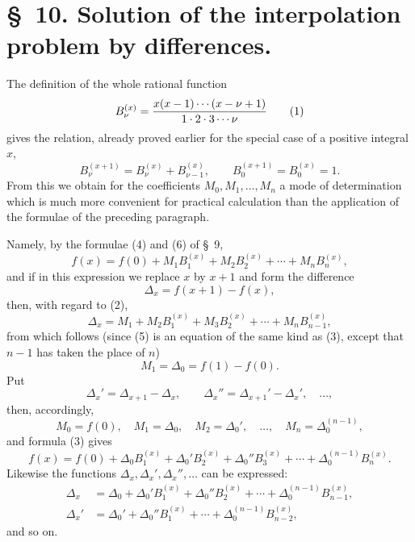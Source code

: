 \documentclass[11pt]{article}
\begin{document}
\section*{\S~10. Solution of the interpolation problem by differences.}

The definition of the whole rational function
\begin{equation}
 B_\nu^{(x)}={x(x-1)\cdots(x-\nu+1)\over 1\cdot2\cdot3\cdots\nu}
\tag{1}
\end{equation}
gives the relation, already proved earlier for the special case of a positive integral $x$,
\begin{equation}
 B_\nu^{(x+1)}=B_\nu^{(x)}+B_{\nu-1}^{(x)},\qquad B_0^{(x+1)}=B_0^{(x)}=1.
\tag{2}
\end{equation}
From this we obtain for the coefficients $M_0,M_1,\ldots,M_n$ a mode of determination which is much more convenient for practical calculation than the application of the formulae of the preceding paragraph.

Namely, by the formulae (4) and (6) of \S~9,
\begin{equation}
 f(x)=f(0)+M_1B_1^{(x)}+M_2B_2^{(x)}+\cdots+M_nB_n^{(x)},
\tag{3}
\end{equation}
and if in this expression we replace $x$ by $x+1$ and form the difference
\begin{equation}
 \Delta_x=f(x+1)-f(x),
\tag{4}
\end{equation}
then, with regard to (2),
\begin{equation}
 \Delta_x=M_1+M_2B_1^{(x)}+M_3B_2^{(x)}+\cdots+M_nB_{n-1}^{(x)},
\tag{5}
\end{equation}
from which follows (since (5) is an equation of the same kind as (3), except that $n-1$ has taken the place of $n$)
\[
 M_1=\Delta_0=f(1)-f(0).
\]
Put
\begin{equation}
 \Delta_x'=\Delta_{x+1}-\Delta_x,\qquad
 \Delta_x''=\Delta_{x+1}'-\Delta_x',\quad\ldots,
\tag{6}
\end{equation}
then, accordingly,
\[
 M_0=f(0),\quad M_1=\Delta_0,
 \quad M_2=\Delta_0',\quad\ldots,\quad M_n=\Delta_0^{(n-1)},
\]
and formula (3) gives
\begin{equation}
 f(x)=f(0)+\Delta_0B_1^{(x)}+\Delta_0'B_2^{(x)}+\Delta_0''B_3^{(x)}+\cdots+\Delta_0^{(n-1)}B_n^{(x)}.
\tag{7}
\end{equation}
Likewise the functions $\Delta_x,\Delta_x',\Delta_x'',\ldots$ can be expressed:
\begin{equation}
\begin{aligned}
 \Delta_x&=\Delta_0+\Delta_0'B_1^{(x)}+\Delta_0''B_2^{(x)}+\cdots+\Delta_0^{(n-1)}B_{n-1}^{(x)},\\
 \Delta_x'&=\Delta_0'+\Delta_0''B_1^{(x)}+\cdots+\Delta_0^{(n-1)}B_{n-2}^{(x)},
\end{aligned}
\tag{8}
\end{equation}
and so on.
\end{document}
